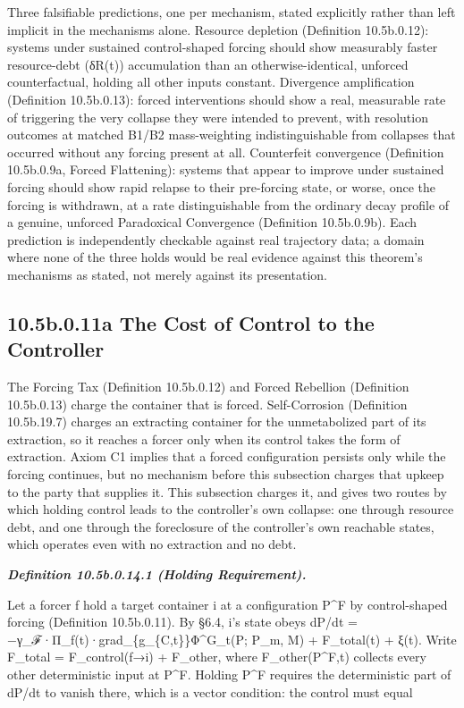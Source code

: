 \documentclass[
]{article}
\begin{document}
Three falsifiable predictions, one per mechanism, stated explicitly
rather than left implicit in the mechanisms alone. Resource depletion
(Definition 10.5b.0.12): systems under sustained control-shaped forcing
should show measurably faster resource-debt (δR(t)) accumulation than an
otherwise-identical, unforced counterfactual, holding all other inputs
constant. Divergence amplification (Definition 10.5b.0.13): forced
interventions should show a real, measurable rate of triggering the very
collapse they were intended to prevent, with resolution outcomes at
matched B1/B2 mass-weighting indistinguishable from collapses that
occurred without any forcing present at all. Counterfeit convergence
(Definition 10.5b.0.9a, Forced Flattening): systems that appear to
improve under sustained forcing should show rapid relapse to their
pre-forcing state, or worse, once the forcing is withdrawn, at a rate
distinguishable from the ordinary decay profile of a genuine, unforced
Paradoxical Convergence (Definition 10.5b.0.9b). Each prediction is
independently checkable against real trajectory data; a domain where
none of the three holds would be real evidence against this theorem's
mechanisms as stated, not merely against its presentation.

\hypertarget{b.0.11a-the-cost-of-control-to-the-controller}{%
\subsection{10.5b.0.11a The Cost of Control to the
Controller}\label{b.0.11a-the-cost-of-control-to-the-controller}}

The Forcing Tax (Definition 10.5b.0.12) and Forced Rebellion (Definition
10.5b.0.13) charge the container that is forced. Self-Corrosion
(Definition 10.5b.19.7) charges an extracting container for the
unmetabolized part of its extraction, so it reaches a forcer only when
its control takes the form of extraction. Axiom C1 implies that a forced
configuration persists only while the forcing continues, but no
mechanism before this subsection charges that upkeep to the party that
supplies it. This subsection charges it, and gives two routes by which
holding control leads to the controller's own collapse: one through
resource debt, and one through the foreclosure of the controller's own
reachable states, which operates even with no extraction and no debt.

\emph{\textbf{Definition 10.5b.0.14.1 (Holding Requirement).}}

Let a forcer f hold a target container i at a configuration P\^{}F by
control-shaped forcing (Definition 10.5b.0.11). By §6.4, i's state obeys
dP/dt = −γ\_ℱ·Π\_f(t)·grad\_\{g\_\{C,t\}\}Φ\^{}G\_t(P; P\_m, M) +
F\_total(t) + ξ(t). Write F\_total = F\_control(f→i) + F\_other, where
F\_other(P\^{}F,t) collects every other deterministic input at P\^{}F.
Holding P\^{}F requires the deterministic part of dP/dt to vanish there,
which is a vector condition: the control must equal
\end{document}
